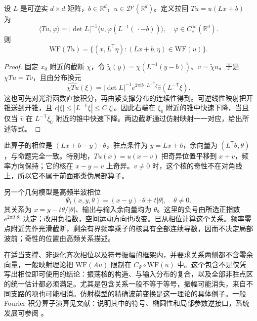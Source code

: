 \begin{proposition}[可逆仿射换元的波前映射]\label{b2:prop:G-affine-wavefront}
设 \(L\) 是可逆实 \(d\times d\) 矩阵，\(b\in\mathbb R^d\)，\(u\in\mathcal D'(\mathbb R^d)\)。定义拉回 \(Tu=u(Lx+b)\) 为
\[
 \langle Tu,\varphi\rangle
 =|\det L|^{-1}
    \langle u,\varphi(L^{-1}(\,\cdot-b))\rangle,
 \quad \varphi\in C_c^\infty(\mathbb R^d).
\]
则
\[
 \mathrm{WF}(Tu)
 =\{(x,L^{\mathsf T}\eta):(Lx+b,\eta)\in\mathrm{WF}(u)\}.
\]
\end{proposition}
\begin{proof}
固定 \(x_0\) 附近的截断 \(\chi\)，令
\(\widetilde\chi(y)=\chi(L^{-1}(y-b))\)、\(v=\widetilde\chi u\)。于是 \(\chi Tu=Tv\)，且由分布换元
\[
 \widehat{\chi Tu}(\xi)
 =|\det L|^{-1}e^{2\pi\mathrm i b\cdot L^{-\mathsf T}\xi}
                 \widehat v(L^{-\mathsf T}\xi).
\]
这也可先对光滑函数直接积分，再由紧支撑分布的连续性得到。可逆线性映射把开锥送到开锥，且
\(c|\xi|\le|L^{-\mathsf T}\xi|\le C|\xi|\)。因此右端在 \(\xi_0\) 附近的锥中快速下降，当且仅当 \(\widehat v\) 在 \(L^{-\mathsf T}\xi_0\) 附近的锥中快速下降。两边截断通过仿射映射一一对应，给出所述等式。
\end{proof}

此算子的相位是 \((Lx+b-y)\cdot\theta\)，驻点条件为 \(y=Lx+b\)，余向量为 \((L^{\mathsf T}\theta,\theta)\)，与命题完全一致。特别地，\(Tu(x)=u(x-v)\) 把奇异位置平移到 \(x+v\)，频率方向保持；它的核在 \(x-y=v\) 上奇异。\(v\ne0\) 时，这个核的奇性不在对角线上，所以它不属于前面那类伪局部算子。

\ProseParagraphBreak
另一个几何模型是高频半波相位
\[
 \Psi_t(x,y,\theta)=(x-y)\cdot\theta+t|\theta|,
 \quad \theta\ne0.
\]
其关系为 \(x=y-t\theta/|\theta|\)、输出与输入余向量均为 \(\theta\)。这里的负号由所选正指数 \(e^{2\pi\mathrm i t|\theta|}\) 决定；改用负指数，空间运动方向也改变。已从相位计算这个关系。频率零点附近先作光滑截断，剩余有界频率乘子的核具有全部连续导数，因而不决定局部波前；奇性的位置由高频关系描述。

在适当支撑、非退化齐次相位以及符号振幅的框架内，并要求关系两侧都不含零余向量，一般映射理论把 \(\mathrm{WF}(Au)\) 限制在 \(C_\Psi\circ\mathrm{WF}(u)\) 中。这个包含不是仅凭写出相位即可使用的结论：振荡核的构造、与输入分布的复合，以及全部非驻点区的统一估计都必须满足。尤其是包含关系一般不等于等号，振幅可能消失，来自不同支路的项也可能相消。仿射模型的精确波前变换是这一理论的具体例子。一般 Fourier 积分算子演算见文献：\cite[Section 5.1, pp.~185--187]{DuistermaatHormander1972FIOII}说明其中的符号、椭圆性和局部参数逆接口，系统发展可参阅 \cite{Hrmander2009AnalysisIV}。

